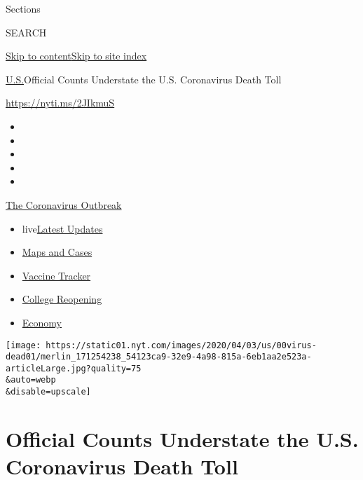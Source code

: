 Sections

SEARCH

\protect\hyperlink{site-content}{Skip to
content}\protect\hyperlink{site-index}{Skip to site index}

\href{/section/us}{U.S.}\textbar{}Official Counts Understate the U.S.
Coronavirus Death Toll

\url{https://nyti.ms/2JIkmuS}

\begin{itemize}
\item
\item
\item
\item
\item
\end{itemize}

\href{https://www.nytimes.com/news-event/coronavirus?action=click\&pgtype=Article\&state=default\&region=TOP_BANNER\&context=storylines_menu}{The
Coronavirus Outbreak}

\begin{itemize}
\tightlist
\item
  live\href{https://www.nytimes.com/2020/08/04/world/coronavirus-cases.html?action=click\&pgtype=Article\&state=default\&region=TOP_BANNER\&context=storylines_menu}{Latest
  Updates}
\item
  \href{https://www.nytimes.com/interactive/2020/us/coronavirus-us-cases.html?action=click\&pgtype=Article\&state=default\&region=TOP_BANNER\&context=storylines_menu}{Maps
  and Cases}
\item
  \href{https://www.nytimes.com/interactive/2020/science/coronavirus-vaccine-tracker.html?action=click\&pgtype=Article\&state=default\&region=TOP_BANNER\&context=storylines_menu}{Vaccine
  Tracker}
\item
  \href{https://www.nytimes.com/2020/08/02/us/covid-college-reopening.html?action=click\&pgtype=Article\&state=default\&region=TOP_BANNER\&context=storylines_menu}{College
  Reopening}
\item
  \href{https://www.nytimes.com/live/2020/08/04/business/stock-market-today-coronavirus?action=click\&pgtype=Article\&state=default\&region=TOP_BANNER\&context=storylines_menu}{Economy}
\end{itemize}

\texttt{[image: https://static01.nyt.com/images/2020/04/03/us/00virus-dead01/merlin\_171254238\_54123ca9-32e9-4a98-815a-6eb1aa2e523a-articleLarge.jpg?quality=75\\\&auto=webp\\\&disable=upscale]}

\hypertarget{official-counts-understate-the-us-coronavirus-death-toll}{%
\section{Official Counts Understate the U.S. Coronavirus Death
Toll}\label{official-counts-understate-the-us-coronavirus-death-toll}}


